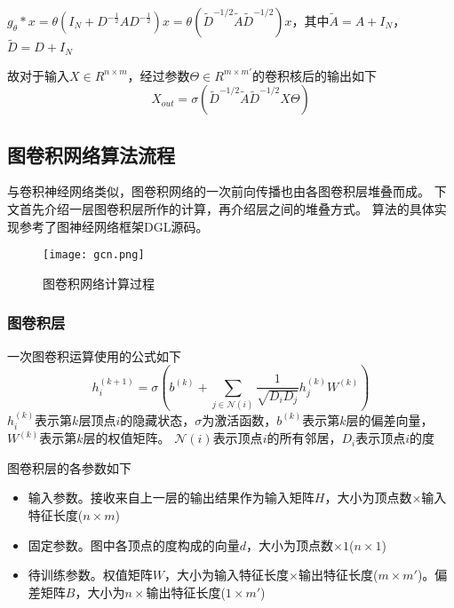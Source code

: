 $g_\theta*x=\theta(I_N+D^{-\frac{1}{2}}AD^{-\frac{1}{2}})x=\theta(\tilde{D}^{-1 / 2} \tilde{A} \tilde{D}^{-1 / 2})x$，其中$\tilde{A}=A+I_N$，$\tilde{D}=D+I_N$

\begin{definition}
    故对于输入$X\in R^{n\times m}$，经过参数$\Theta\in R^{m\times m'}$的卷积核后的输出如下
    \begin{equation}
        X_{out}=\sigma\left(\tilde{D}^{-1 / 2} \tilde{A} \tilde{D}^{-1 / 2} X \Theta\right)
    \end{equation}
\end{definition}

\subsection{图卷积网络算法流程}
与卷积神经网络类似，图卷积网络的一次前向传播也由各图卷积层堆叠而成。
下文首先介绍一层图卷积层所作的计算，再介绍层之间的堆叠方式。
算法的具体实现参考了图神经网络框架DGL源码。

\begin{figure}[htb]
    \centering
    \texttt{[image: gcn.png]}
    \caption{图卷积网络计算过程}
\end{figure}

\subsubsection{图卷积层}

\begin{definition}
    一次图卷积运算使用的公式如下
    \begin{equation}
        h_i^{(k+1)} = \sigma(b^{(k)} + \sum_{j\in\mathcal{N}(i)}\frac{1}{\sqrt{D_iD_j}} h_j^{(k)}W^{(k)})
    \end{equation}
    $h_i^{(k)}$表示第$k$层顶点$i$的隐藏状态，$\sigma$为激活函数，$b^{(k)}$表示第$k$层的偏差向量，$W^{(k)}$表示第$k$层的权值矩阵。
    $\mathcal{N}(i)$表示顶点$i$的所有邻居，$D_i$表示顶点$i$的度
\end{definition}

图卷积层的各参数如下
\begin{itemize}
    \item 输入参数。接收来自上一层的输出结果作为输入矩阵$H$，大小为顶点数$\times $输入特征长度($n\times m$)
    \item 固定参数。图中各顶点的度构成的向量$d$，大小为顶点数$\times 1$($n\times 1$)
    \item 待训练参数。权值矩阵$W$，大小为输入特征长度$\times$输出特征长度($m\times m'$)。偏差矩阵$B$，大小为$n\times$输出特征长度($1\times m'$)
\end{itemize}

